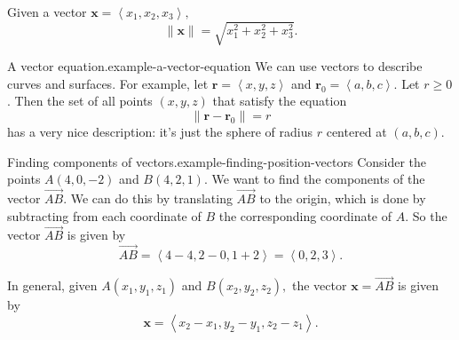 \documentclass[10pt,]{book}
\numberwithin{equation}{section}
\newcommand{\vv}[1]{\mathbf{#1}}
\newcommand{\dotprod}[1]{\left\langle #1 \right\rangle}
\begin{document}
%
\par
\hypertarget{p-1093}{}%
Given a vector \(\vv{x} = \dotprod{x_{1},x_{2},x_{3}},\)%
\begin{equation*}
\|\vv{x}\| = \sqrt{x_{1}^{2}+x_{2}^{2}+x_{3}^{2}}.
\end{equation*}
%
\begin{example}{A vector equation.}{example-a-vector-equation}%
\hypertarget{p-1094}{}%
We can use vectors to describe curves and surfaces. For example, let \(\vv{r} = \dotprod{x,y,z}\) and \(\vv{r}_{0} = \dotprod{a,b,c}\). Let \(r\geq0\). Then the set of all points \((x,y,z)\) that satisfy the equation%
%
\begin{equation*}
\|\vv{r}-\vv{r}_{0}\| = r
\end{equation*}
\hypertarget{p-1095}{}%
has a very nice description: it's just the sphere of radius \(r\) centered at \((a,b,c)\).%
\end{example}
\begin{example}{Finding components of vectors.}{example-finding-position-vectors}%
\hypertarget{p-1096}{}%
Consider the points \(A(4,0,-2)\) and \(B(4,2,1)\). We want to find the components of the vector \(\overrightarrow{AB}\). We can do this by translating \(\overrightarrow{AB}\) to the origin, which is done by subtracting from each coordinate of \(B\) the corresponding coordinate of \(A\). So the vector \(\overrightarrow{AB}\) is given by%
%
\begin{equation*}
\overrightarrow{AB} = \dotprod{4-4,2-0,1+2} = \dotprod{0,2,3}.
\end{equation*}
\end{example}
\hypertarget{p-1097}{}%
In general, given \(A(x_{1},y_{1},z_{1})\) and \(B(x_{2},y_{2},z_{2}),\) the vector \(\vv{x} = \overrightarrow{AB}\) is given by%
%
\begin{equation*}
\vv{x} = \dotprod{x_{2}-x_{1},y_{2}-y_{1},z_{2}-z_{1}}.
\end{equation*}
\end{document}
